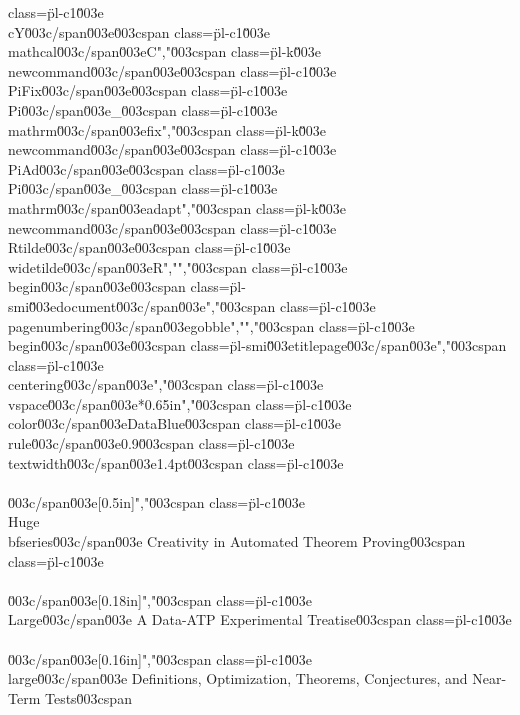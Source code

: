 {{{class=\"pl-c1\"\u003e\\cY\u003c/span\u003e}{\u003cspan class=\"pl-c1\"\u003e\\mathcal\u003c/span\u003e{C}}","\u003cspan class=\"pl-k\"\u003e\\newcommand\u003c/span\u003e{\u003cspan class=\"pl-c1\"\u003e\\PiFix\u003c/span\u003e}{\u003cspan class=\"pl-c1\"\u003e\\Pi\u003c/span\u003e_{\u003cspan class=\"pl-c1\"\u003e\\mathrm\u003c/span\u003e{fix}}}","\u003cspan class=\"pl-k\"\u003e\\newcommand\u003c/span\u003e{\u003cspan class=\"pl-c1\"\u003e\\PiAd\u003c/span\u003e}{\u003cspan class=\"pl-c1\"\u003e\\Pi\u003c/span\u003e_{\u003cspan class=\"pl-c1\"\u003e\\mathrm\u003c/span\u003e{adapt}}}","\u003cspan class=\"pl-k\"\u003e\\newcommand\u003c/span\u003e{\u003cspan class=\"pl-c1\"\u003e\\Rtilde\u003c/span\u003e}{\u003cspan class=\"pl-c1\"\u003e\\widetilde\u003c/span\u003e{R}}","","\u003cspan class=\"pl-c1\"\u003e\\begin\u003c/span\u003e{\u003cspan class=\"pl-smi\"\u003edocument\u003c/span\u003e}","\u003cspan class=\"pl-c1\"\u003e\\pagenumbering\u003c/span\u003e{gobble}","","\u003cspan class=\"pl-c1\"\u003e\\begin\u003c/span\u003e{\u003cspan class=\"pl-smi\"\u003etitlepage\u003c/span\u003e}","\u003cspan class=\"pl-c1\"\u003e\\centering\u003c/span\u003e","\u003cspan class=\"pl-c1\"\u003e\\vspace\u003c/span\u003e*{0.65in}","{\u003cspan class=\"pl-c1\"\u003e\\color\u003c/span\u003e{DataBlue}\u003cspan class=\"pl-c1\"\u003e\\rule\u003c/span\u003e{0.9\u003cspan class=\"pl-c1\"\u003e\\textwidth\u003c/span\u003e}{1.4pt}}\u003cspan class=\"pl-c1\"\u003e\\\\\u003c/span\u003e[0.5in]","{\u003cspan class=\"pl-c1\"\u003e\\Huge\\bfseries\u003c/span\u003e Creativity in Automated Theorem Proving\u003cspan class=\"pl-c1\"\u003e\\\\\u003c/span\u003e[0.18in]}","{\u003cspan class=\"pl-c1\"\u003e\\Large\u003c/span\u003e A Data-ATP Experimental Treatise\u003cspan class=\"pl-c1\"\u003e\\\\\u003c/span\u003e[0.16in]}","{\u003cspan class=\"pl-c1\"\u003e\\large\u003c/span\u003e Definitions, Optimization, Theorems, Conjectures, and Near-Term Tests\u003cspan }}}
